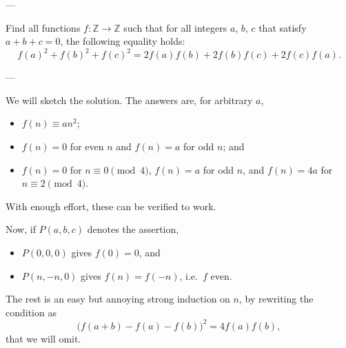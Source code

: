 
---

Find all functions $f:\mathbb Z\to\mathbb Z$ such that for all integers $a$, $b$, $c$ that satisfy $a+b+c=0$, the following equality holds:
\[f(a)^2+f(b)^2+f(c)^2=2f(a)f(b)+2f(b)f(c)+2f(c)f(a).\]

---

We will sketch the solution. The answers are, for arbitrary $a$,
\begin{itemize}[itemsep=0em]
    \item $f(n)\equiv an^2$;
    \item $f(n)=0$ for even $n$ and $f(n)=a$ for odd $n$; and
    \item $f(n)=0$ for $n\equiv0\pmod4$, $f(n)=a$ for odd $n$, and $f(n)=4a$ for $n\equiv2\pmod4$.
\end{itemize}
With enough effort, these can be verified to work.

Now, if $P(a,b,c)$ denotes the assertion,
\begin{itemize}[itemsep=0em]
    \item $P(0,0,0)$ gives $f(0)=0$, and
    \item $P(n,-n,0)$ gives $f(n)=f(-n)$, i.e.\ $f$ even.
\end{itemize}
The rest is an easy but annoying strong induction on $n$, by rewriting the condition as
\[\big(f(a+b)-f(a)-f(b)\big)^2=4f(a)f(b),\]
that we will omit.

